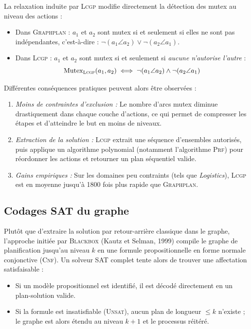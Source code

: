 La relaxation induite par \textsc{Lcgp} modifie directement la détection des mutex au niveau des actions :
\begin{itemize}
    \item Dans \textsc{Graphplan} : $a_1$ et $a_2$ sont mutex si et seulement si elles ne sont pas indépendantes, c'est-à-dire : $\neg(a_1 \angle a_2) \lor \neg(a_2 \angle a_1)$.
    \item Dans \textsc{Lcgp} : $a_1$ et $a_2$ sont mutex si et seulement si \emph{aucune n'autorise l'autre} :
    \begin{equation}
        \operatorname{Mutex}_{\textsc{Lcgp}}(a_1, a_2) \iff \neg(a_1 \angle a_2) \land \neg(a_2 \angle a_1)
    \end{equation}
\end{itemize}

Différentes conséquences pratiques peuvent alors être observées : 
\begin{enumerate}
    \item \emph{Moins de contraintes d'exclusion :} Le nombre d'arcs mutex diminue drastiquement dans chaque couche d'actions, ce qui permet de compresser les étapes et d'atteindre le but en moins de niveaux.
    \item \emph{Extraction de la solution :} \textsc{Lcgp} extrait une séquence d'ensembles autorisés, puis applique un algorithme polynomial (notamment l'algorithme \textsc{Prf}) pour réordonner les actions et retourner un plan séquentiel valide.
    \item \emph{Gains empiriques :} Sur les domaines peu contraints (tels que \emph{Logistics}), \textsc{Lcgp} est en moyenne jusqu'à 1800 fois plus rapide que \textsc{Graphplan}.
\end{enumerate}

\subsection{Codages SAT du graphe}

Plutôt que d'extraire la solution par retour-arrière classique dans le graphe, l'approche initiée par \textsc{Blackbox} (Kautz et Selman, 1999) compile le graphe de planification jusqu'au niveau $k$ en une formule propositionnelle en forme normale conjonctive (\textsc{Cnf}). Un solveur SAT complet tente alors de trouver une affectation satisfaisable :
\begin{itemize}
    \item Si un modèle propositionnel est identifié, il est décodé directement en un plan-solution valide.
    \item Si la formule est insatisfiable (\textsc{Unsat}), aucun plan de longueur $\leqslant k$ n'existe ; le graphe est alors étendu au niveau $k+1$ et le processus réitéré.
\end{itemize}

